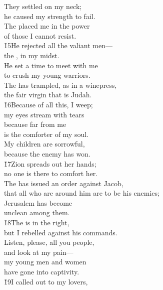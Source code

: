 \begin{poetry}
\poeml They settled on my neck; \\
\poemll    he caused my strength to fail. \\
\poeml The  placed me in the power \\
\poemll    of those I cannot resist. \\
\poeml \v{15}He rejected all the valiant men--- \\
\poemll    the , in my midst. \\
\poeml He set a time to meet with me \\
\poemll    to crush my young warriors. \\
\poeml The  has trampled, as in a winepress, \\
\poemll    the fair virgin that is Judah. \\
\poeml \v{16}Because of all this, I weep; \\
\poemll    my eyes stream with tears \\
\poeml because far from me \\
\poemll    is the comforter of my soul. \\
\poeml My children are sorrowful, \\
\poemll    because the enemy has won. \\
\poeml \v{17}Zion spreads out her hands; \\
\poemll    no one is there to comfort her. \\
\poeml The  has issued an order against Jacob, \\
\poemll    that all who are around him are to be his enemies; \\
\poeml Jerusalem has become \\
\poemll    unclean among them. \\
\poeml \v{18}The  is in the right, \\
\poemll    but I rebelled against his commands. \\
\poeml Listen, please, all you people, \\
\poemll    and look at my pain--- \\
\poeml my young men and women \\
\poemll    have gone into captivity. \\
\poeml \v{19}I called out to my lovers, \\

\end{poetry}
